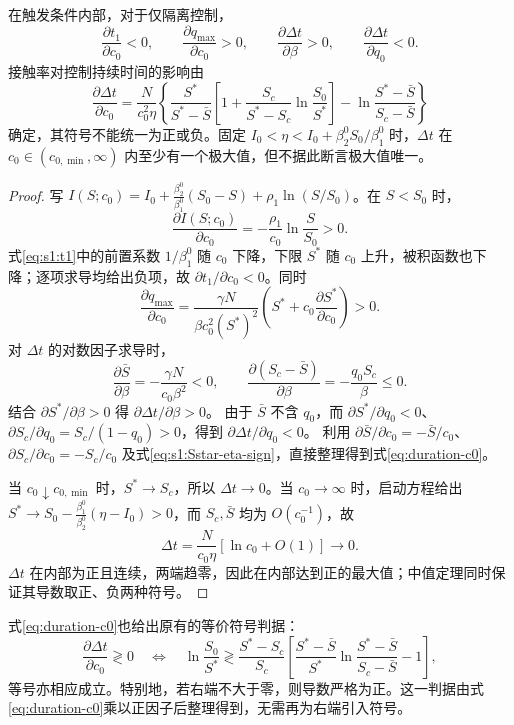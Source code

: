 \documentclass[lang=cn,a4paper,newtx]{elegantpaper}
\numberwithin{equation}{section}
\theoremstyle{plain}
\begin{document}
\begin{proposition}
\label{prop:contact-effects}\label{cor:s1:duration-sensitivity}
在触发条件内部，对于仅隔离控制，
\[
\frac{\partial t_1}{\partial c_0}<0,\qquad
\frac{\partial q_{\max}}{\partial c_0}>0,\qquad
\frac{\partial\Delta t}{\partial\beta}>0,\qquad
\frac{\partial\Delta t}{\partial q_0}<0.
\]
接触率对控制持续时间的影响由
\begin{equation}
\frac{\partial\Delta t}{\partial c_0}
=\frac{N}{c_0^2\eta}
\left\{\frac{S^*}{S^*-\bar S}
\left[1+\frac{S_c}{S^*-S_c}\ln\frac{S_0}{S^*}\right]
-\ln\frac{S^*-\bar S}{S_c-\bar S}\right\}
\label{eq:duration-c0}
\end{equation}
确定，其符号不能统一为正或负。固定 $I_0<\eta<I_0+\beta_2^0S_0/\beta_1^0$ 时，$\Delta t$ 在 $c_0\in(c_{0,\min},\infty)$ 内至少有一个极大值，但不据此断言极大值唯一。
\end{proposition}
\begin{proof}
写 $I(S;c_0)=I_0+\frac{\beta_2^0}{\beta_1^0}(S_0-S)+\rho_1\ln(S/S_0)$。在 $S<S_0$ 时，
\[
\frac{\partial I(S;c_0)}{\partial c_0}=-\frac{\rho_1}{c_0}\ln\frac{S}{S_0}>0.
\]
式\eqref{eq:s1:t1}中的前置系数 $1/\beta_1^0$ 随 $c_0$ 下降，下限 $S^*$ 随 $c_0$ 上升，被积函数也下降；逐项求导均给出负项，故 $\partial t_1/\partial c_0<0$。同时
\[
\frac{\partial q_{\max}}{\partial c_0}
=\frac{\gamma N}{\beta c_0^2(S^*)^2}
\left(S^*+c_0\frac{\partial S^*}{\partial c_0}\right)>0.
\]
对 $\Delta t$ 的对数因子求导时，
\[
\frac{\partial\bar S}{\partial\beta}=-\frac{\gamma N}{c_0\beta^2}<0,
\qquad
\frac{\partial(S_c-\bar S)}{\partial\beta}=-\frac{q_0S_c}{\beta}\le0.
\]
结合 $\partial S^*/\partial\beta>0$ 得 $\partial\Delta t/\partial\beta>0$。
由于 $\bar S$ 不含 $q_0$，而 $\partial S^*/\partial q_0<0$、$\partial S_c/\partial q_0=S_c/(1-q_0)>0$，得到 $\partial\Delta t/\partial q_0<0$。
利用 $\partial\bar S/\partial c_0=-\bar S/c_0$、$\partial S_c/\partial c_0=-S_c/c_0$ 及式\eqref{eq:s1:Sstar-eta-sign}，直接整理得到式\eqref{eq:duration-c0}。

当 $c_0\downarrow c_{0,\min}$ 时，$S^*\to S_c$，所以 $\Delta t\to0$。当 $c_0\to\infty$ 时，启动方程给出
$S^*\to S_0-\frac{\beta_1^0}{\beta_2^0}(\eta-I_0)>0$，而 $S_c,\bar S$ 均为 $O(c_0^{-1})$，故
\[
\Delta t=\frac{N}{c_0\eta}[\ln c_0+O(1)]\longrightarrow0.
\]
$\Delta t$ 在内部为正且连续，两端趋零，因此在内部达到正的最大值；中值定理同时保证其导数取正、负两种符号。
\end{proof}
式\eqref{eq:duration-c0}也给出原有的等价符号判据：
\begin{equation}
\frac{\partial\Delta t}{\partial c_0}\gtrless0
\quad\Longleftrightarrow\quad
\ln\frac{S_0}{S^*}\gtrless
\frac{S^*-S_c}{S_c}
\left[\frac{S^*-\bar S}{S^*}\ln\frac{S^*-\bar S}{S_c-\bar S}-1\right],
\label{eq:duration-c0-equivalent}
\end{equation}
等号亦相应成立。特别地，若右端不大于零，则导数严格为正。这一判据由式\eqref{eq:duration-c0}乘以正因子后整理得到，无需再为右端引入符号。
\end{document}
